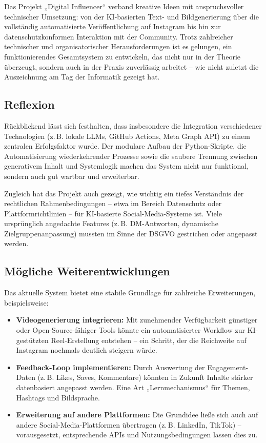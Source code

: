 \documentclass[a4paper,12pt]{article}
\begin{document}
Das Projekt „Digital Influencer“ verband kreative Ideen mit anspruchsvoller technischer Umsetzung: von der KI-basierten Text- und Bildgenerierung über die vollständig automatisierte Veröffentlichung auf Instagram bis hin zur datenschutzkonformen Interaktion mit der Community. Trotz zahlreicher technischer und organisatorischer Herausforderungen ist es gelungen, ein funktionierendes Gesamtsystem zu entwickeln, das nicht nur in der Theorie überzeugt, sondern auch in der Praxis zuverlässig arbeitet – wie nicht zuletzt die Auszeichnung am Tag der Informatik gezeigt hat.

\subsection{Reflexion}

Rückblickend lässt sich festhalten, dass insbesondere die Integration verschiedener Technologien (z.\,B. lokale LLMs, GitHub Actions, Meta Graph API) zu einem zentralen Erfolgsfaktor wurde. Der modulare Aufbau der Python-Skripte, die Automatisierung wiederkehrender Prozesse sowie die saubere Trennung zwischen generativem Inhalt und Systemlogik machen das System nicht nur funktional, sondern auch gut wartbar und erweiterbar.

Zugleich hat das Projekt auch gezeigt, wie wichtig ein tiefes Verständnis der rechtlichen Rahmenbedingungen – etwa im Bereich Datenschutz oder Plattformrichtlinien – für KI-basierte Social-Media-Systeme ist. Viele ursprünglich angedachte Features (z.\,B. DM-Antworten, dynamische Zielgruppenanpassung) mussten im Sinne der DSGVO gestrichen oder angepasst werden.

\subsection{Mögliche Weiterentwicklungen}

Das aktuelle System bietet eine stabile Grundlage für zahlreiche Erweiterungen, beispielsweise:

\begin{itemize}
    \item \textbf{Videogenerierung integrieren:} Mit zunehmender Verfügbarkeit günstiger oder Open-Source-fähiger Tools könnte ein automatisierter Workflow zur KI-gestützten Reel-Erstellung entstehen – ein Schritt, der die Reichweite auf Instagram nochmals deutlich steigern würde.
    \item \textbf{Feedback-Loop implementieren:} Durch Auswertung der Engagement-Daten (z.\,B. Likes, Saves, Kommentare) könnten in Zukunft Inhalte stärker datenbasiert angepasst werden. Eine Art „Lernmechanismus“ für Themen, Hashtags und Bildsprache.
    \item \textbf{Erweiterung auf andere Plattformen:} Die Grundidee ließe sich auch auf andere Social-Media-Plattformen übertragen (z.\,B. LinkedIn, TikTok) – vorausgesetzt, entsprechende APIs und Nutzungsbedingungen lassen dies zu.
\end{itemize}
\end{document}
